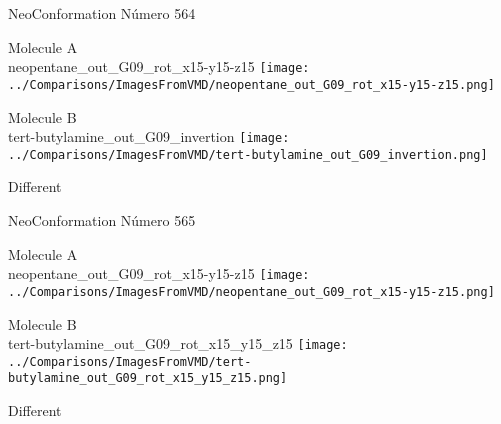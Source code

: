 \vtab[-3cm]
\begin{center}
{\large NeoConformation \tab Número 564}
\end{center}
\begin{multicols}{2}
\begin{center}
Molecule A \\ 
neopentane\_out\_G09\_rot\_x15-y15-z15
\texttt{[image: ../Comparisons/ImagesFromVMD/neopentane\_out\_G09\_rot\_x15-y15-z15.png]}
\\
\vtab

\columnbreak
Molecule B \\ 
tert-butylamine\_out\_G09\_invertion
\texttt{[image: ../Comparisons/ImagesFromVMD/tert-butylamine\_out\_G09\_invertion.png]}
\\
\vtab


\end{center}
\end{multicols}
\begin{center}
\textcolor{NavyBlue}{\Large Different}
\end{center}

 \newpage

\vtab[-3cm]
\begin{center}
{\large NeoConformation \tab Número 565}
\end{center}
\begin{multicols}{2}
\begin{center}
Molecule A \\ 
neopentane\_out\_G09\_rot\_x15-y15-z15
\texttt{[image: ../Comparisons/ImagesFromVMD/neopentane\_out\_G09\_rot\_x15-y15-z15.png]}
\\
\vtab

\columnbreak
Molecule B \\ 
tert-butylamine\_out\_G09\_rot\_x15\_y15\_z15
\texttt{[image: ../Comparisons/ImagesFromVMD/tert-butylamine\_out\_G09\_rot\_x15\_y15\_z15.png]}
\\
\vtab


\end{center}
\end{multicols}
\begin{center}
\textcolor{NavyBlue}{\Large Different}
\end{center}

 \newpage

